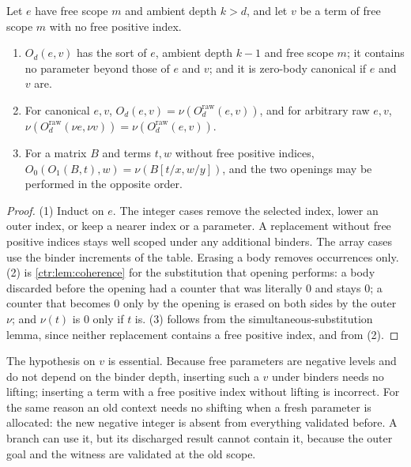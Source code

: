 \begin{lemma}[Opening]\label{ctr:lem:opening}
Let $e$ have free scope $m$ and ambient depth $k>d$, and let $v$ be a term of free scope
$m$ with no free positive index.
\begin{enumerate}
\item $O_d(e,v)$ has the sort of $e$, ambient depth $k-1$ and free scope $m$; it contains
no parameter beyond those of $e$ and $v$; and it is zero-body canonical if $e$ and $v$ are.
\item For canonical $e,v$, $O_d(e,v)=\nu(O_d^{\mathrm{raw}}(e,v))$, and for arbitrary raw
$e,v$, $\nu(O_d^{\mathrm{raw}}(\nu e,\nu v))=\nu(O_d^{\mathrm{raw}}(e,v))$.
\item For a matrix $B$ and terms $t,w$ without free positive indices,
$O_0(O_1(B,t),w)=\nu(B[t/x,w/y])$, and the two openings may be performed in the opposite
order.
\end{enumerate}
\end{lemma}
\begin{proof}
(1) Induct on $e$. The integer cases remove the selected index, lower an outer index, or
keep a nearer index or a parameter. A replacement without free positive indices stays well
scoped under any additional binders. The array cases use the binder increments of the
table. Erasing a body removes occurrences only. (2) is \cref{ctr:lem:coherence} for the
substitution that opening performs: a body discarded before the opening had a counter that
was literally $0$ and stays $0$; a counter that becomes $0$ only by the opening is erased on
both sides by the outer $\nu$; and $\nu(t)$ is $0$ only if $t$ is. (3) follows from the
simultaneous-substitution lemma, since neither replacement contains a free positive index,
and from (2).
\end{proof}

The hypothesis on $v$ is essential. Because free parameters are negative levels and do not
depend on the binder depth, inserting such a $v$ under binders needs no lifting; inserting a
term with a free positive index without lifting is incorrect. For the same reason an old
context needs no shifting when a fresh parameter is allocated: the new negative integer is
absent from everything validated before. A branch can use it, but its discharged result
cannot contain it, because the outer goal and the witness are validated at the old scope.


